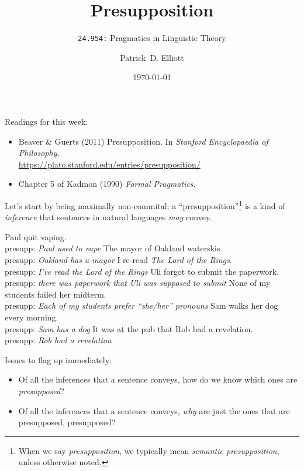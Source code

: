 \documentclass[cronos,landscape,paper=letter]{ling-handout}
\title{Presupposition}
\subtitle{\texttt{24.954:} Pragmatics in Linguistic Theory}
\date{\today}
\author{Patrick~D. Elliott}
\begin{document}
\maketitle

Readings for this week:

\begin{itemize}

  \item Beaver \& Guerts (2011) Presupposition. In \textit{Stanford Encyclopaedia of Philosophy}.\\
    \url{https://plato.stanford.edu/entries/presupposition/}

  \item Chapter 5 of Kadmon (1990) \textit{Formal Pragmatics}.

\end{itemize}

Let's start by being maximally non-commital: a \enquote{presupposition}\footnote{When we say \textit{presupposition}, we typically mean \textit{semantic presupposition}, unless otherwise noted.} is a kind of \textit{inference} that sentences in natural languages \textit{may} convey.

\pex
\a Paul quit vaping.\\
presupp: \textit{Paul used to vape}
\a The mayor of Oakland waterskis.\\
presupp: \textit{Oakland has a mayor}
\a I re-read \textit{The Lord of the Rings}.\\
presupp: \textit{I've read the Lord of the Rings}
\a Uli forgot to submit the paperwork.\\
presupp: \textit{there was paperwork that Uli was supposed to submit}
\a None of my students failed her midterm.\\
presupp: \textit{Each of my students prefer \enquote{she/her} pronouns}
\a Sam walks her dog every morning.\\
presupp: \textit{Sam has a dog}
\a It was at the pub that Rob had a revelation.\\
presupp: \textit{Rob had a revelation}
\xe

Issues to flag up immediately:

\begin{itemize}

  \item Of all the inferences that a sentence conveys, how do we know which ones are \textit{presupposed}?

  \item Of all the inferences that a sentence conveys, \textit{why} are just the ones that are presupposed, presupposed?

\end{itemize}
\end{document}
